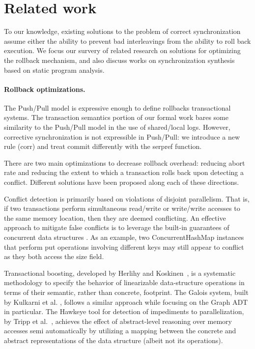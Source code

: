 \section{Related work}
To our knowledge, existing solutions to the problem of correct synchronization assume either the ability to prevent bad interleavings from the ability to roll back execution. We focus our survery of related research on solutions for optimizing the rollback mechanism, and also discuss works on synchronization synthesis based on static program analysis.

\paragraph{Rollback optimizations.}
The Push/Pull model \cite{KoskinenP15} is expressive enough to define rollbacks transactional systems. The transaction semantics portion of our formal work bares some similarity to the Push/Pull model in the use of shared/local logs. However, corrective synchronization is not expressible in Push/Pull: we introduce a new rule ({\sf corr}) and treat commit differently with the {\sf serpref} function.

There are two main optimizations to decrease rollback overhead: reducing abort rate and reducing the extent to which a transaction rolls back upon detecting a conflict. Different solutions have been proposed along each of these directions.

Conflict detection is primarily based on violations of disjoint parallelism. That is, if two transactions perform simultaneous read/write or write/write accesses to the same memory location, then they are deemed conflicting. 
%
An effective approach to mitigate false conflicts is to leverage the built-in guarantees of concurrent data structures \cite{ppopp/HerlihyK08,Galois,TYFS:OOPSLA11}. As an example, two {\sf ConcurrentHashMap} instances that perform {\sf put} operations involving different keys may still appear to conflict as they both access the {\sf size} field.

Transactional boosting, developed by Herlihy and Koskinen~\cite{ppopp/HerlihyK08}, is a systematic methodology to specify the behavior of linearizable data-structure operations in terms of their semantic, rather than concrete, footprint. The Galois system, built by Kulkarni et al. \cite{Galois}, follows a similar approach while focusing on the {\sf Graph} ADT in particular. The Hawkeye tool for detection of impediments to parallelization, by Tripp et al.~\cite{TYFS:OOPSLA11}, achieves the effect of abstract-level reasoning over memory accesses semi automatically by utilizing a mapping between the concrete and abstract representations of the data structure (albeit not its operations).  

